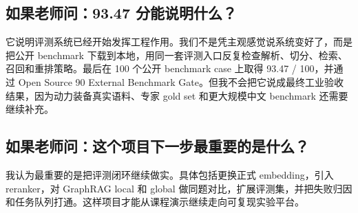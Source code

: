 \documentclass[11pt, a4paper]{ctexart}
\begin{document}
\subsection*{如果老师问：93.47 分能说明什么？}

它说明评测系统已经开始发挥工程作用。我们不是凭主观感觉说系统变好了，而是把公开 benchmark 下载到本地，用同一套评测入口反复检查解析、切分、检索、召回和重排策略。最后在 100 个公开 benchmark case 上取得 93.47 / 100，并通过 Open Source 90 External Benchmark Gate。但我不会把它说成最终工业验收结果，因为动力装备真实语料、专家 gold set 和更大规模中文 benchmark 还需要继续补充。\\

\subsection*{如果老师问：这个项目下一步最重要的是什么？}

我认为最重要的是把评测闭环继续做实。具体包括更换正式 embedding，引入 reranker，对 GraphRAG local 和 global 做同题对比，扩展评测集，并把失败归因和任务队列打通。这样项目才能从课程演示继续走向可复现实验平台。\\
\end{document}

